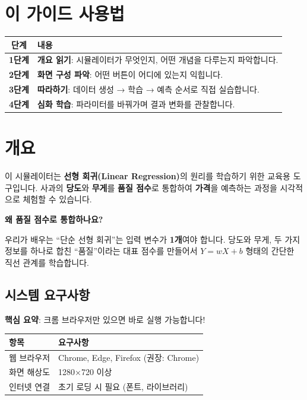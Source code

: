 \documentclass[11pt,a4paper]{article}
\begin{document}
\section*{이 가이드 사용법}

\begin{center}
\begin{tabular}{|c|p{10cm}|}
\hline
\rowcolor{bgblue}
\textbf{단계} & \textbf{내용} \\
\hline
\textbf{1단계} & \textbf{개요 읽기}: 시뮬레이터가 무엇인지, 어떤 개념을 다루는지 파악합니다. \\
\hline
\textbf{2단계} & \textbf{화면 구성 파악}: 어떤 버튼이 어디에 있는지 익힙니다. \\
\hline
\textbf{3단계} & \textbf{따라하기}: 데이터 생성 → 학습 → 예측 순서로 직접 실습합니다. \\
\hline
\textbf{4단계} & \textbf{심화 학습}: 파라미터를 바꿔가며 결과 변화를 관찰합니다. \\
\hline
\end{tabular}
\end{center}

\tableofcontents
\newpage

\section{개요}

이 시뮬레이터는 \textbf{선형 회귀(Linear Regression)}의 원리를 학습하기 위한 교육용 도구입니다. 
사과의 \textbf{당도}와 \textbf{무게}를 \textbf{품질 점수}로 통합하여 \textbf{가격}을 예측하는 과정을 시각적으로 체험할 수 있습니다.

\begin{tipbox}
\textbf{왜 품질 점수로 통합하나요?}

우리가 배우는 ``단순 선형 회귀''는 입력 변수가 \textbf{1개}여야 합니다. 
당도와 무게, 두 가지 정보를 하나로 합친 ``품질''이라는 대표 점수를 만들어서 
$Y = wX + b$ 형태의 간단한 직선 관계를 학습합니다.
\end{tipbox}

\subsection{시스템 요구사항}

\textbf{핵심 요약}: 크롬 브라우저만 있으면 바로 실행 가능합니다!

\begin{center}
\begin{tabular}{ll}
\toprule
\textbf{항목} & \textbf{요구사항} \\
\midrule
웹 브라우저 & Chrome, Edge, Firefox (권장: Chrome) \\
화면 해상도 & 1280×720 이상 \\
인터넷 연결 & 초기 로딩 시 필요 (폰트, 라이브러리) \\
\bottomrule
\end{tabular}
\end{center}
\end{document}
